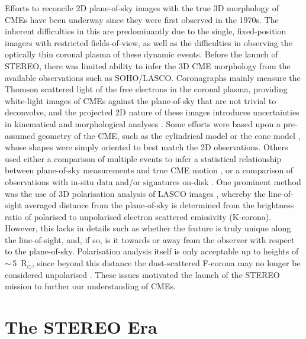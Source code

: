 \documentclass[preprint2]{aastex}
\begin{document}
Efforts to reconcile 2D plane-of-sky images with the true 3D morphology of CMEs have been underway since they were first observed in the 1970s. The inherent difficulties in this are predominantly due to the single, fixed-position imagers with restricted fields-of-view, as well as the difficulties in observing the optically thin coronal plasma of these dynamic events. Before the launch of STEREO, there was limited ability to infer the 3D CME morphology from the available observations such as SOHO/LASCO. Coronagraphs mainly measure the Thomson scattered light of the free electrons in the coronal plasma, providing white-light images of CMEs against the plane-of-sky that are not trivial to deconvolve,  and the projected 2D nature of these images introduces uncertainties in kinematical and morphological analyses \citep{2007A&A...469..339V}. Some efforts were based upon a pre-assumed geometry of the CME, such as the cylindrical model \citep{2004A&A...422..307C} or the cone model \citep{2005JGRA..11008103X, 2002JGRA..107.1223Z}, whose shapes were simply oriented to best match the 2D observations. Others used either a comparison of multiple events to infer a statistical relationship between plane-of-sky measurements and true CME motion \citep{2005AnGeo..23.1033S, 2005A&A...440..373H}, or a comparison of observations with in-situ data and/or signatures on-disk \citep{2008SoPh..250..347D, 2008JGRA..11301104H}. One prominent method was the use of 3D polarisation analysis of LASCO images \citep{2004Sci...305...66M}, whereby the line-of-sight averaged distance from the plane-of-sky is determined from the brightness ratio of polarised to unpolarised electron scattered emissivity (K-corona). However, this lacks in details such as whether the feature is truly unique along the line-of-sight, and, if so, is it towards or away from the observer with respect to the plane-of-sky. Polarisation analysis itself is only acceptable up to heights of $\sim$\,5~R$_{\odot}$, since beyond this distance the dust-scattered F-corona may no longer be considered unpolarised \citep{1966gtsc.book.....B}. These issues motivated the launch of the STEREO mission to further our understanding of CMEs.


\section{The STEREO Era}
\end{document}
